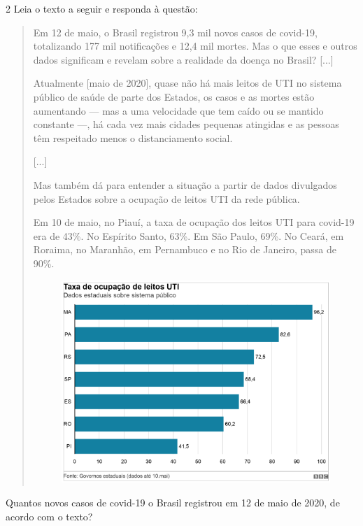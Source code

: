 
\num{2} Leia o texto a seguir e responda à questão:

\begin{quote}
Em 12 de maio, o Brasil registrou 9,3 mil novos casos de covid-19,
totalizando 177 mil notificações e 12,4 mil mortes. Mas o que esses e
outros dados significam e revelam sobre a realidade da doença no Brasil?
{[}...{]}

Atualmente {[}maio de 2020{]}, quase não há mais leitos de UTI no
sistema público de saúde de parte dos Estados, os casos e as mortes
estão aumentando --- mas a uma velocidade que tem caído ou se mantido
constante ---, há cada vez mais cidades pequenas atingidas e as pessoas
têm respeitado menos o distanciamento social.

{[}...{]}

Mas também dá para entender a situação a partir de dados divulgados
pelos Estados sobre a ocupação de leitos UTI da rede pública.

Em 10 de maio, no Piauí, a taxa de ocupação dos leitos UTI para covid-19
era de 43\%. No Espírito Santo, 63\%. Em São Paulo, 69\%. No Ceará, em
Roraima, no Maranhão, em Pernambuco e no Rio de Janeiro, passa de 90\%.

\begin{figure}[htpb!]
\includegraphics[width=.5\textwidth]{./imgs/img23.png}
\end{figure}
\end{quote}

Quantos novos casos de covid-19 o Brasil registrou em 12 de maio de 2020, de acordo com o texto?

